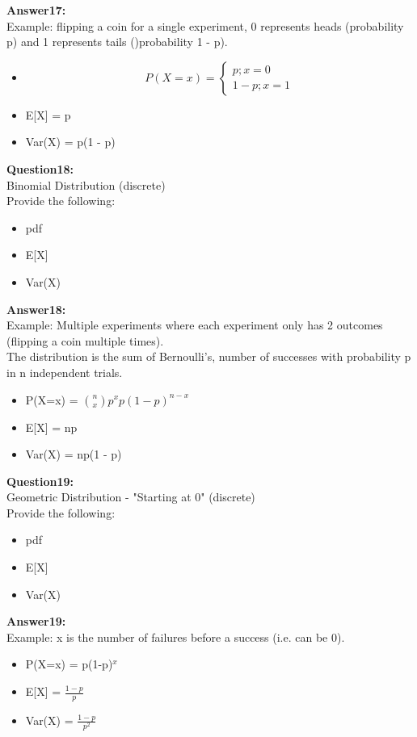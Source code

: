 \documentclass{article}
\begin{document}
\textbf{Answer17:} \\
Example: flipping a coin for a single experiment, 0 represents heads (probability p) and 1 represents tails ()probability 1 - p).
\begin{itemize}
	\item \[P(X=x) =
		\begin{cases} 
			p; x = 0 \\
			1 - p; x = 1   
		\end{cases}
	\]
	\item E[X] = p
	\item Var(X) = p(1 - p)
\end{itemize}


\textbf{Question18:} \\
Binomial Distribution (discrete)\\
Provide the following:
\begin{itemize}
	\item pdf
	\item E[X]
	\item Var(X)
\end{itemize}

\textbf{Answer18:} \\
Example: Multiple experiments where each experiment only has 2 outcomes (flipping a coin multiple times).\\
The distribution is the sum of Bernoulli's, number of successes with probability p in n independent trials.
\begin{itemize}
	\item P(X=x) = $\binom{n}{x}p^{x}p(1-p)^{n-x}$
	\item E[X] = np
	\item Var(X) = np(1 - p)
\end{itemize}


\textbf{Question19:} \\
Geometric Distribution - "Starting at 0" (discrete)\\
Provide the following:
\begin{itemize}
	\item pdf
	\item E[X]
	\item Var(X)
\end{itemize}

\textbf{Answer19:} \\
Example: x is the number of failures before a success (i.e. can be 0).
\begin{itemize}
	\item P(X=x) = p(1-p)$^x$
	\item E[X] = $\frac{1 - p}{p}$
	\item Var(X) = $\frac{1 - p}{p^2}$
\end{itemize}
\end{document}
